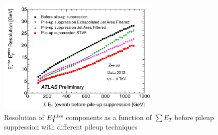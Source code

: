 \begin{figure}[h!]
  \centering
  \captionsetup{justification=centering}

  \includegraphics[width=0.7\textwidth]{figures/MetReso}
   \caption{Resolution of $E_{\textrm{\footnotesize\sc t}}^{\rm miss}$ components as a function of $\sum E_{T}$ before pileup suppression with different pileup techniques~\cite{MET8TeV}}
  \label{fig:met}
\end{figure}





